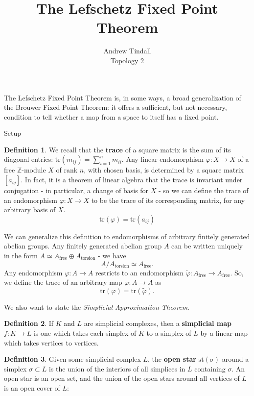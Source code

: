 \documentclass[12pt]{article}
\newcommand{\Z}{\mathbb{Z}}
\theoremstyle{definition}
\newtheorem{definition}{Definition}
\begin{document}
 
 
	\title{The Lefschetz Fixed Point Theorem}
\author{Andrew Tindall\\
Topology 2}
 
\maketitle
The Lefschetz Fixed Point Theorem is, in some ways, a broad generalization of the Brouwer Fixed Point Theorem: it offers a sufficient, but not necessary, condition to tell whether a map from a space to itself has a fixed point.
\begin{section}{Setup}
	\begin{definition}
	We recall that the \textbf{trace} of a square matrix is the sum of its diagonal entries: $\text{tr}(m_{ij}) = \sum_{i= 1}^n m_{ii} $. Any linear endomorphism $\varphi: X \to X$ of a free $\Z$-module $X$ of rank $n$, with chosen basis, is determined by a square matrix $[a_{ij}]$. In fact, it is a theorem of linear algebra that the trace is invariant under conjugation - in particular, a change of basis for $X$ - so we can define the trace of an endomorphism $\varphi: X \to X$ to be the trace of its corresponding matrix, for any arbitrary basis of $X$.
	\[\text{tr}(\varphi) = \text{tr}(a_{ij})\]
	\par We can generalize this definition to endomorphisms of arbitrary finitely generated abelian groups. Any finitely generated abelian group $A$ can be written uniquely in the form $A \simeq A_{\text{free}} \oplus A_{\text{torsion}}$ - we have
	\[A / A_{\text{torsion}} \simeq A_{\text{free}}.\]
	Any endomorphism $\varphi: A \to A$ restricts to an endomorphism $\tilde \varphi: A_{\text{free}} \to A_{\text{free}}$. So, we define the trace of an arbitrary map $\varphi: A \to A$ as
	\[\text{tr}(\varphi) = \text{tr}(\tilde \varphi).\]
\end{definition}
We also want to state the \textit{Simplicial Approximation Theorem}.
\begin{definition}
	If $K$ and $L$ are simplicial complexes, then a \textbf{simplicial map} $f: K \to L$ is one which takes each simplex of $K$ to a simplex of $L$ by a linear map which takes vertices to vertices.
\end{definition}
\begin{definition}
	Given some simplicial complex $L$, the \textbf{open star} $\text{st}(\sigma)$ around a simplex $\sigma \subset L$ is the union of the interiors of all simplices in $L$ containing $\sigma$. An open star is an open set, and the union of the open stars around all vertices of $L$ is an open cover of $L$:

\end{definition}
\end{section}
\end{document}

